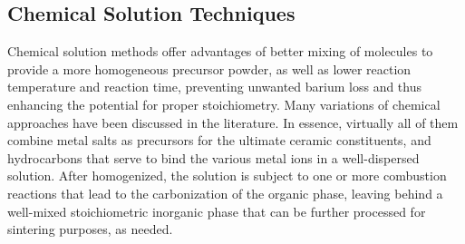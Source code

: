 
\vspace{12pt}
\subsection{Chemical Solution Techniques}
Chemical solution methods offer advantages of better mixing of molecules to provide a more homogeneous precursor powder, as well as lower reaction temperature and reaction time, preventing unwanted barium loss and thus enhancing the potential for proper stoichiometry. Many variations of chemical approaches have been discussed in the literature. In essence, virtually all of them combine metal salts as precursors for the ultimate ceramic constituents, and hydrocarbons that serve to bind the various metal ions in a well-dispersed solution. After homogenized, the solution is subject to one or more combustion reactions that lead to the carbonization of the organic phase, leaving behind a well-mixed stoichiometric inorganic phase that can be further processed for sintering purposes, as needed. 

